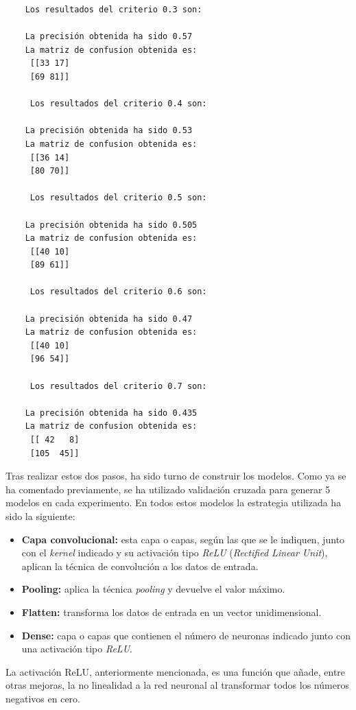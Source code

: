 \begin{verbatim}
    Los resultados del criterio 0.3 son:

    La precisión obtenida ha sido 0.57
    La matriz de confusion obtenida es:
     [[33 17]
     [69 81]]
    
     Los resultados del criterio 0.4 son:
    
    La precisión obtenida ha sido 0.53
    La matriz de confusion obtenida es:
     [[36 14]
     [80 70]]
    
     Los resultados del criterio 0.5 son:
    
    La precisión obtenida ha sido 0.505
    La matriz de confusion obtenida es:
     [[40 10]
     [89 61]]
    
     Los resultados del criterio 0.6 son:
    
    La precisión obtenida ha sido 0.47
    La matriz de confusion obtenida es:
     [[40 10]
     [96 54]]
    
     Los resultados del criterio 0.7 son:
    
    La precisión obtenida ha sido 0.435
    La matriz de confusion obtenida es:
     [[ 42   8]
     [105  45]]
\end{verbatim}

Tras realizar estos dos pasos, ha sido turno de construir los modelos. Como ya se ha comentado previamente, se ha utilizado validación cruzada para generar 5 modelos en cada experimento. En todos estos modelos la estrategia utilizada ha sido la siguiente:
\begin{itemize}
    \item \textbf{Capa convolucional:} esta capa o capas, según las que se le indiquen, junto con el \emph{kernel} indicado y su activación tipo \emph{ReLU} (\emph{Rectified Linear Unit}), aplican la técnica de convolución a los datos de entrada.
    \item \textbf{Pooling:} aplica la técnica \emph{pooling} y devuelve el valor máximo.
    \item \textbf{Flatten:} transforma los datos de entrada en un vector unidimensional.
    \item \textbf{Dense:} capa o capas que contienen el número de neuronas indicado junto con una activación tipo \emph{ReLU}.
\end{itemize}

La activación ReLU, anteriormente mencionada, es una función que añade, entre otras mejoras, la no linealidad a la red neuronal al transformar todos los números negativos en cero.

